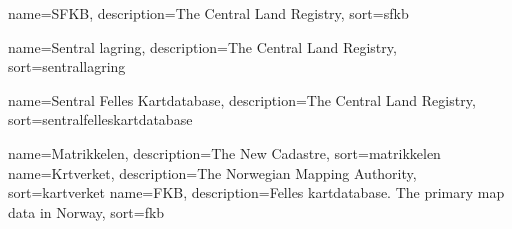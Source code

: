{
	name=SFKB,
	description={The Central Land Registry},
	sort=sfkb
}

{
	name=Sentral lagring,
	description={The Central Land Registry},
	sort=sentrallagring
}



{
	name=Sentral Felles Kartdatabase,
	description={The Central Land Registry},
	sort=sentralfelleskartdatabase
}

{
	name=Matrikkelen,
	description={The New Cadastre},
	sort=matrikkelen
}
{
	name=Krtverket,
	description={The Norwegian Mapping Authority},
	sort=kartverket
}
{
	name=FKB,
	description={Felles kartdatabase. The primary map data in Norway},
	sort=fkb
}


\makeglossaries